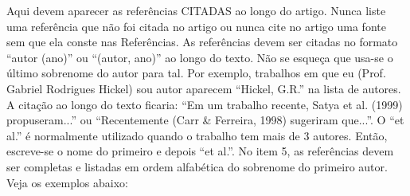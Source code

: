\documentclass{relatorio}
\begin{document}
Aqui devem aparecer as referências CITADAS ao longo do artigo. Nunca liste uma referência que não foi citada no artigo ou nunca cite no artigo uma fonte sem que ela conste nas Referências. As referências devem ser citadas no formato ``autor (ano)'' ou ``(autor, ano)'' ao longo do texto. Não se esqueça que usa-se o último sobrenome do autor para tal. Por exemplo, trabalhos em que eu (Prof. Gabriel Rodrigues Hickel) sou autor aparecem ``Hickel, G.R.'' na lista de autores. A citação ao longo do texto ficaria: ``Em um trabalho recente, Satya et al. (1999) propuseram...'' ou ``Recentemente (Carr \& Ferreira, 1998) sugeriram que...''. O ``et al.'' é normalmente utilizado quando o trabalho tem mais de 3 autores. Então, escreve-se o nome do primeiro e depois ``et al.''. No item 5, as referências devem ser completas e listadas em ordem alfabética do sobrenome do primeiro autor. Veja os exemplos abaixo:

\end{document}
